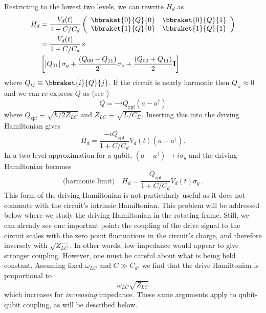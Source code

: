 Restricting to the lowest two levels, we can rewrite $H_d$ as
\begin{align}
H_d
&= \frac{V_d(t)}{1 + C/C_d} \left(
{\begin{array}{cc}\bbraket{0}{Q}{0} & \bbraket{0}{Q}{1} \\ \bbraket{1}{Q}{0} & \bbraket{1}{Q}{1}\end{array}}
\right) \\
&= \frac{V_d(t)}{1 + C/C_d} \times \nonumber \\
&\left[
\left| Q_{01} \right| \sigma_y
+ \frac{\left( Q_{00} - Q_{11} \right)}{2} \sigma_z
+ \frac{\left( Q_{00} + Q_{11} \right)}{2} \mathbf{I}
\right]
\end{align}
where $Q_{ij} \equiv \bbraket{i}{Q}{j}$.
If the circuit is nearly harmonic then $Q_{ii}\approx 0$ and we can re-express $Q$ as (see \citeinternaltype {}) \begin{equation}
Q = -iQ_{\textrm{zpf}}(a-a^{\dagger}) \end{equation}
where $Q_{\textrm{zpf}}\equiv \sqrt{\hbar/2Z_{LC}}$ and $Z_{LC} \equiv \sqrt{L/C_{\Sigma}}$.
Inserting this into the driving Hamiltonian gives \begin{equation}
H_d = \frac{-iQ_{\textrm{zpf}}}{1+C/C_d}V_d(t) (a-a^{\dagger}). \end{equation}
In a two level approximation for a qubit, $(a-a^{\dagger}) \rightarrow i \sigma_y$ and the driving Hamiltonian becomes \begin{equation}
\text{(harmonic limit)} \quad H_d = \frac{Q_{\textrm{zpf}}}{1+C/C_d}V_d(t) \sigma_y \, . \label{eq:drivingHamiltonianLabFrame}
\end{equation}
This form of the driving Hamiltonian is not particularly useful as it does not commute with the circuit's intrinsic Hamiltonian.
This problem will be addressed below where we study the driving Hamiltonian in the rotating frame.
Still, we can already see one important point: the coupling of the drive signal to the circuit scales with the zero point fluctuations in the circuit's charge, and therefore inversely with $\sqrt{Z_{LC}}$.
In other words, low impedance would appear to give stronger coupling.
However, one must be careful about what is being held constant.
Assuming fixed $\omega_{LC}$ and $C \gg C_d$, we find that the drive Hamiltonian is proportional to
\begin{equation}
\omega_{LC} \sqrt{Z_{LC}}
\end{equation}
which increases for \emph{increasing} impedance.
These same arguments apply to qubit-qubit coupling, as will be described below.

